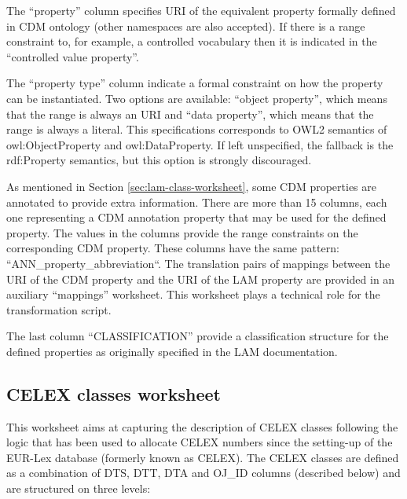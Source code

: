 The ``property'' column specifies URI of the equivalent property formally
defined in CDM ontology (other namespaces are also accepted). If there
is a range constraint to, for example, a controlled vocabulary then it
is indicated in the ``controlled value property''.

The ``property type'' column indicate a formal constraint on how the property
can be instantiated. Two options are available: ``object property'', which means
that the range is always an URI and ``data property'', which means that the range
is always a literal. This specifications corresponds to OWL2 semantics of owl:ObjectProperty
and owl:DataProperty. If left unspecified, the fallback is the rdf:Property semantics,
but this option is strongly discouraged.

As mentioned in Section \ref{sec:lam-class-worksheet}, some CDM properties are annotated to provide
extra information. There are more than 15 columns, each one representing a CDM annotation property that may be used for the defined property. The values in the columns provide the range constraints on the corresponding CDM property. These columns have the same pattern: ``ANN\_{property\_abbreviation}``. The translation pairs of mappings between the URI of the CDM property and the URI of the LAM property are provided in an auxiliary ``mappings'' worksheet. This worksheet plays a technical role for the transformation script.



The last column ``CLASSIFICATION'' provide a classification structure for the defined properties as originally specified in the LAM documentation.

\subsection{CELEX classes worksheet}

This worksheet aims at capturing the description of CELEX classes
following the logic that has been used to allocate CELEX numbers since
the setting-up of the EUR-Lex database (formerly known as CELEX). The
CELEX classes are defined as a combination of DTS, DTT, DTA and OJ\_ID
columns (described below) and are structured on three levels:

